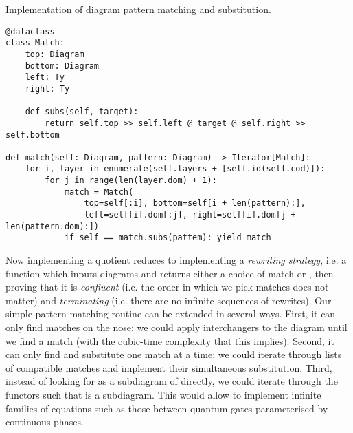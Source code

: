 \begin{python}
{\normalfont Implementation of diagram pattern matching and substitution.}

\begin{verbatim}
@dataclass
class Match:
    top: Diagram
    bottom: Diagram
    left: Ty
    right: Ty

    def subs(self, target):
        return self.top >> self.left @ target @ self.right >> self.bottom

def match(self: Diagram, pattern: Diagram) -> Iterator[Match]:
    for i, layer in enumerate(self.layers + [self.id(self.cod)]):
        for j in range(len(layer.dom) + 1):
            match = Match(
                top=self[:i], bottom=self[i + len(pattern):],
                left=self[i].dom[:j], right=self[i].dom[j + len(pattern.dom):])
            if self == match.subs(pattem): yield match
\end{verbatim}
\end{python}

Now implementing a quotient reduces to implementing a \emph{rewriting strategy}, i.e. a function which inputs diagrams and returns either a choice of match or , then proving that it is \emph{confluent} (i.e. the order in which we pick matches does not matter) and \emph{terminating} (i.e. there are no infinite sequences of rewrites).
Our simple pattern matching routine can be extended in several ways.
First, it can only find matches on the nose: we could apply interchangers to the diagram until we find a match (with the cubic-time complexity that this implies).
Second, it can only find and substitute one match at a time: we could iterate through lists of compatible matches and implement their simultaneous substitution.
Third, instead of looking for  as a subdiagram of  directly, we could iterate through the functors  such that  is a subdiagram.
This would allow to implement infinite families of equations such as those between quantum gates parameterised by continuous phases.

